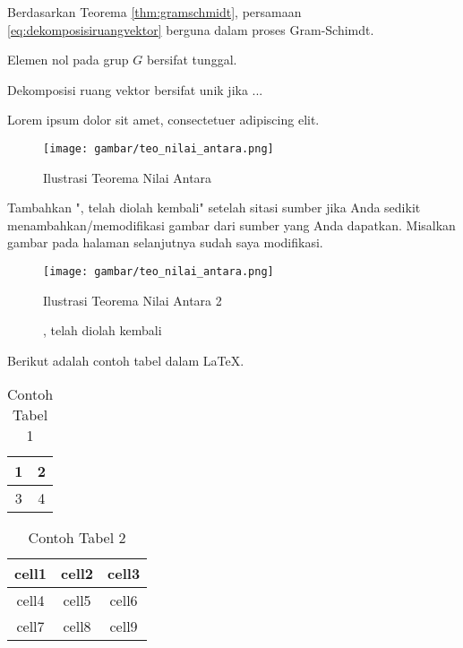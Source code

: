 Berdasarkan Teorema \ref{thm:gramschmidt}, persamaan \eqref{eq:dekomposisiruangvektor} berguna dalam proses Gram-Schimdt.

\begin{lemma}
    Elemen nol pada grup $G$ bersifat tunggal.
\end{lemma}

\begin{corollary}
    Dekomposisi ruang vektor bersifat unik jika ...
\end{corollary}

\begin{remark}
    Lorem ipsum dolor sit amet, consectetuer adipiscing elit.
\end{remark}

\begin{figure}[H]
    \centering
    \texttt{[image: gambar/teo\_nilai\_antara.png]}
    \caption{Ilustrasi Teorema Nilai Antara}
    \caption*{\small \parencite{varberg2007calculus}} %
    \label{fig:teonilaiantara}
\end{figure}

Tambahkan ", telah diolah kembali" setelah sitasi sumber jika Anda sedikit menambahkan/memodifikasi gambar dari sumber yang Anda dapatkan. Misalkan gambar pada halaman selanjutnya sudah saya modifikasi.
\begin{figure}[H]
    \centering
    \texttt{[image: gambar/teo\_nilai\_antara.png]}
    \caption{Ilustrasi Teorema Nilai Antara 2}
    \caption*{\small \parencite{varberg2007calculus}, telah diolah kembali} %
    \label{fig:teonilaiantara2}
\end{figure}

Berikut adalah contoh tabel dalam \LaTeX.
\begin{table}[H]
    \centering
    \caption{Contoh Tabel 1}
    \begin{tabular}{|c|c|}
        \hline
        1 & 2 \\
        \hline
        3 & 4\\
        \hline
    \end{tabular}
    \label{tab:my_table}
\end{table}

\begin{table}[H]
    \centering
    \caption{Contoh Tabel 2}
    \begin{tabular}{ |c|c|c| } 
        \hline
        cell1 & cell2 & cell3 \\ 
        \hline
        cell4 & cell5 & cell6 \\ 
        cell7 & cell8 & cell9 \\ 
        \hline
    \end{tabular}
    \label{tab:my_label2}
\end{table}

